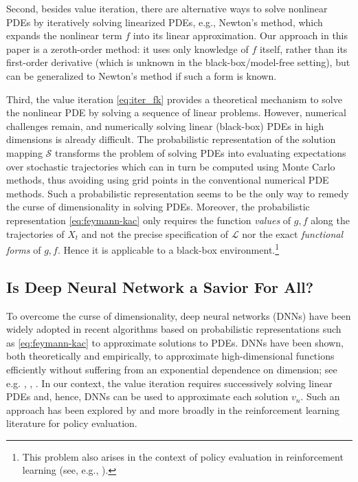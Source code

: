 \documentclass[twoside,11pt]{article}
\newcommand{\1}{\mathbf{1}}
\numberwithin{equation}{section}
\begin{document}
Second, besides value iteration, there are alternative ways to solve nonlinear PDEs by iteratively solving linearized PDEs, e.g., Newton's method, which expands the nonlinear term $f$ into its linear approximation.
Our approach in this paper is a zeroth-order method: it uses only knowledge of $f$ itself, rather than its first-order derivative (which is unknown in the black-box/model-free setting), but can be generalized to Newton's method if such a form is known.


Third, the value iteration \eqref{eq:iter_fk} provides a theoretical mechanism to solve the nonlinear PDE by solving a sequence of linear problems. However, numerical challenges remain, and numerically solving linear (black-box) PDEs in high dimensions is already difficult. The probabilistic representation of the solution mapping $\mathcal S$ transforms the problem of solving PDEs into evaluating expectations over stochastic trajectories which can in turn be computed using Monte Carlo methods, thus avoiding using grid points in the conventional numerical PDE methods. Such a probabilistic representation seems to be the only way to remedy the curse of dimensionality in solving PDEs. Moreover, the probabilistic representation \eqref{eq:feymann-kac} only requires the function {\it values} of $g,f$ along the trajectories of $X_t$ and not the precise specification of $\mathcal L$ nor the exact {\it functional forms} of $g,f$.  Hence it is applicable to a black-box environment.\footnote{This problem also arises in the context of policy evaluation in reinforcement learning (see, e.g., \citealt{jia2022policy}).}






\subsection{Is Deep Neural Network a Savior For All?}\label{sec: necessity}
To overcome the curse of dimensionality, deep neural networks (DNNs) have been widely adopted in recent algorithms based on probabilistic representations such as \eqref{eq:feymann-kac} to approximate solutions to PDEs.
DNNs have been shown, both theoretically and empirically, to approximate high-dimensional functions efficiently without suffering from an exponential dependence on dimension;
see e.g. \cite{han18}, \cite{bec23}, \cite{germain23}.
 In our context, the value iteration requires successively solving linear PDEs and, hence, DNNs can be used to approximate each solution $v_n$. Such an approach has been explored  by \cite{jia2022policy} and more broadly in the reinforcement learning literature for policy evaluation.
\end{document}

